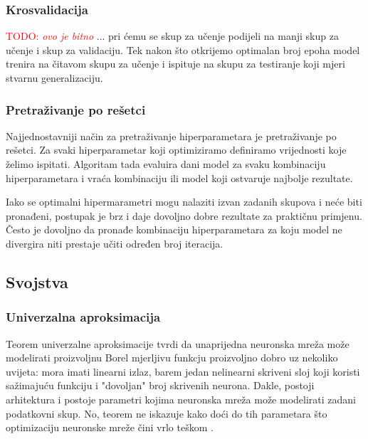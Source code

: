 \documentclass[times, utf8, diplomski]{fer}
\def\TODO#1{\noindent\textcolor{red}{TODO: \textit{#1}}\newline}
\def\todo#1{\TODO{#1}}
\begin{document}
\subsubsection{Krosvalidacija}
\label{sec:crossval}
\todo{ovo je bitno}
... pri ćemu se skup za učenje podijeli na manji skup za učenje i skup za validaciju. Tek nakon što otkrijemo optimalan broj epoha model trenira na čitavom skupu za učenje i ispituje na skupu za testiranje koji mjeri stvarnu generalizaciju.

\subsubsection{Pretraživanje po rešetci}
\label{sec:grid_search}
Najjednostavniji način za pretraživanje hiperparametara je pretraživanje po rešetci. Za svaki hiperparametar koji optimiziramo definiramo vrijednosti koje želimo ispitati. Algoritam tada evaluira dani model za svaku kombinaciju hiperparametara i vraća kombinaciju ili model koji ostvaruje najbolje rezultate.

Iako se optimalni hipermarametri mogu nalaziti izvan zadanih skupova i neće biti pronađeni, postupak je brz i daje dovoljno dobre rezultate za praktičnu primjenu. Često je dovoljno da pronađe kombinaciju hiperparametara za koju model ne divergira niti prestaje učiti određen broj iteracija.

\subsection{Svojstva}
\label{sec:svojstva}

\subsubsection{Univerzalna aproksimacija}
Teorem univerzalne aproksimacije tvrdi da unaprijedna neuronska mreža može modelirati proizvoljnu Borel mjerljivu funkcju proizvoljno dobro uz nekoliko uvijeta: mora imati linearni izlaz, barem jedan nelinearni skriveni sloj koji koristi sažimajuću funkciju i "dovoljan" broj skrivenih neurona. Dakle, postoji arhitektura i postoje parametri kojima neuronska mreža može modelirati zadani podatkovni skup. No, teorem ne iskazuje kako doći do tih parametara što optimizaciju neuronske mreže čini vrlo teškom \citep{goodfellowbook}. 
\end{document}
